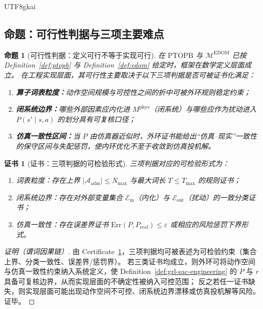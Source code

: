 \documentclass[12pt]{article}
\newtheorem{proposition}{命题}[section]
\newtheorem{certificate}{证书}[section]
\newcommand{\PTOPB}{\ensuremath{\mathrm{PTOPB}}}
\newcommand{\EDOM}{\ensuremath{\mathcal{M}^{\mathrm{EDOM}}}}
\begin{document}
\begin{CJK*}{UTF8}{gkai}
\subsection{命题：可行性判据与三项主要难点}

\begin{proposition}[可行性判据：定义可行不等于实现可行]
\label{prop:feasibility-vs-implementation}
在 \PTOPB{} 与 \EDOM{} 已按 Definition~\ref{def:ptopb} 与 Definition~\ref{def:edom} 给定时，框架在数学定义层面成立。
在工程实现层面，其可行性主要取决于以下三项判据是否可被证书化满足：
\begin{enumerate}
  \item \textbf{算子词表粒度：}动作空间规模与可控性之间的折中可被外环规则稳定约束；
  \item \textbf{闭系统边界：}哪些外部因素应内化进 $M^{\mathrm{phys}}$（闭系统）与哪些应作为扰动进入 $P(s'\mid s,a)$ 的划分具有可复核口径；
  \item \textbf{仿真一致性区间：}当 $P$ 由仿真器近似时，外环证书能给出“仿真--现实”一致性的保守区间与失配惩罚，使内环优化不至于收敛到仿真投机解。
\end{enumerate}
\end{proposition}

\begin{certificate}[证书：三项判据的可检验形式]
\label{cert:feasibility-criteria}
三项判据对应的可检验形式为：
\begin{enumerate}
  \item 词表粒度：存在上界 $|\mathcal{A}_{\mathrm{adm}}|\le N_{\max}$ 与最大词长 $T\le T_{\max}$ 的规则证书；
  \item 闭系统边界：存在对外部变量集合 $\mathcal{E}_{\mathrm{in}}$（内化）与 $\mathcal{E}_{\mathrm{out}}$（扰动）的一致分类证书；
  \item 仿真一致性：存在误差界证书 $\mathrm{Err}(P,P_{\mathrm{real}})\le \varepsilon$ 或相应的风险惩罚下界形式。
\end{enumerate}
\end{certificate}

\begin{proof}[证明（谓词因果链）]
由 Certificate~\ref{cert:feasibility-criteria}，三项判据均可被表述为可检验约束（集合上界、分类一致性、误差界/惩罚界）。
若三类证书均成立，则外环可将动作空间与仿真一致性约束纳入系统定义，使 Definition~\ref{def:grl-sac-engineering} 的 $P$ 与 $r$ 具备可复核边界，从而实现层面的不确定性被纳入可控范围；
  反之若任一证书缺失，则实现层面可能出现动作空间不可控、闭系统边界漂移或仿真投机解等风险。证毕。
\end{proof}


\end{CJK*}
\end{document}
